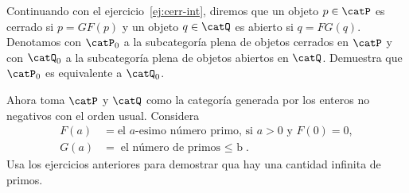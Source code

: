 \documentclass[article]{memoir}
\begin{document}
\begin{exercise}
  Continuando con el ejercicio~\ref{ej:cerr-int}, diremos que un objeto \(p\in\catP\) es cerrado si \(p=GF(p)\) y un objeto \(q\in\catQ\) es abierto si \(q=FG(q)\). Denotamos con \(\catP_0\) a la subcategoría plena de objetos cerrados en 
  \(\catP\) y con \(\catQ_0\) a la subcategoría plena de objetos abiertos en \(\catQ\). Demuestra que \(\catP_0\) es equivalente a \(\catQ_0\).
\end{exercise}

\begin{exercise}
  Ahora toma \(\catP\) y \(\catQ\) como la categoría generada por los enteros no negativos con el orden usual. Considera
  \begin{align*}
    F(a) &= \text{el \(a\)-esimo número primo, si \(a>0\) y \(F(0)=0\)},\\
    G(a) &= \text{el número de primos \(\leq\) b}.
  \end{align*}
  Usa los ejercicios anteriores para demostrar qua hay una cantidad infinita de primos.
\end{exercise}
\end{document}
